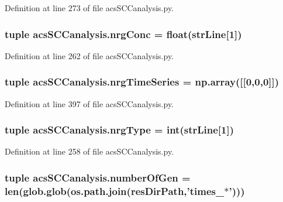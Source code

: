 Definition at line 273 of file acs\-S\-C\-Canalysis.\-py.

\hypertarget{a00096_a24d5f5a61d56c596017396ad272ef4a4}{
\subsubsection[{nrg\-Conc}]{\setlength{\rightskip}{0pt plus 5cm}tuple acs\-S\-C\-Canalysis.\-nrg\-Conc = float({\bf str\-Line}\mbox{[}1\mbox{]})}}\label{a00096_a24d5f5a61d56c596017396ad272ef4a4}


Definition at line 262 of file acs\-S\-C\-Canalysis.\-py.

\hypertarget{a00096_ad4d4abc783f2f7f8d1084b1144b4fe2f}{
\subsubsection[{nrg\-Time\-Series}]{\setlength{\rightskip}{0pt plus 5cm}tuple acs\-S\-C\-Canalysis.\-nrg\-Time\-Series = np.\-array(\mbox{[}\mbox{[}0,0,0\mbox{]}\mbox{]})}}\label{a00096_ad4d4abc783f2f7f8d1084b1144b4fe2f}


Definition at line 397 of file acs\-S\-C\-Canalysis.\-py.

\hypertarget{a00096_a0d0c83fd90489be59b1f5a31dadf4469}{
\subsubsection[{nrg\-Type}]{\setlength{\rightskip}{0pt plus 5cm}tuple acs\-S\-C\-Canalysis.\-nrg\-Type = int({\bf str\-Line}\mbox{[}1\mbox{]})}}\label{a00096_a0d0c83fd90489be59b1f5a31dadf4469}


Definition at line 258 of file acs\-S\-C\-Canalysis.\-py.

\hypertarget{a00096_a9a81829f850e2e125e3c94214da7a1f0}{
\subsubsection[{number\-Of\-Gen}]{\setlength{\rightskip}{0pt plus 5cm}tuple acs\-S\-C\-Canalysis.\-number\-Of\-Gen = len(glob.\-glob(os.\-path.\-join({\bf res\-Dir\-Path},'times\-\_\-$\ast$')))}}\label{a00096_a9a81829f850e2e125e3c94214da7a1f0}


